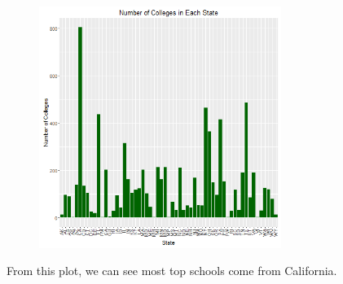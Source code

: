 \documentclass{article}
\begin{document}
\begin{figure}[H]
\includegraphics[width=0.7\textwidth]{../images/college-frequency.png}
\end{figure}
\noindent From this plot, we can see most top schools come from California. 

\clearpage
\end{document}
